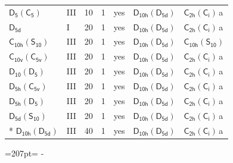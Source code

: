 \documentclass[10pt,a4paper]{article}
\newcommand{\needspace}[1]{\par\penalty-100\begingroup\dimen0=#1\relax\dimen2=\pagegoal
  \advance\dimen2-\pagetotal\ifdim\dimen0>\dimen2\relax\ifdim\dimen2>0pt\vfil\break\fi\fi
  \endgroup}
\numberwithin{equation}{section}
\newcommand{\grp}[1]{\mathsf{#1}}
\newcommand{\clsletter}[1]{\,{\scriptsize\color{black!55}#1}}
\begin{document}
{\begin{longtable}{@{}llrrlll@{}}
\href{D5-C5.pdf}{$\grp{D_{5}}(\grp{C_{5}})$} & III & 10 & 1 & yes & \href{D10h-D5d.pdf}{$\grp{D_{10h}}(\grp{D_{5d}})$} & \href{C2h-S2.pdf}{$\grp{C_{2h}}(\grp{C_{i}})$}\clsletter{a}\\
\href{../../../rotation/data/pdf/D5d.pdf}{$\grp{D_{5d}}$} & I & 20 & 1 & yes & \href{D10h-D5d.pdf}{$\grp{D_{10h}}(\grp{D_{5d}})$} & \href{C2h-S2.pdf}{$\grp{C_{2h}}(\grp{C_{i}})$}\clsletter{a}\\
\href{C10h-S10.pdf}{$\grp{C_{10h}}(\grp{S_{10}})$} & III & 20 & 1 & yes & \href{D10h-D5d.pdf}{$\grp{D_{10h}}(\grp{D_{5d}})$} & \href{C10h-S10.pdf}{$\grp{C_{10h}}(\grp{S_{10}})$}\\
\href{C10v-C5v.pdf}{$\grp{C_{10v}}(\grp{C_{5v}})$} & III & 20 & 1 & yes & \href{D10h-D5d.pdf}{$\grp{D_{10h}}(\grp{D_{5d}})$} & \href{C2h-S2.pdf}{$\grp{C_{2h}}(\grp{C_{i}})$}\clsletter{a}\\
\href{D10-D5.pdf}{$\grp{D_{10}}(\grp{D_{5}})$} & III & 20 & 1 & yes & \href{D10h-D5d.pdf}{$\grp{D_{10h}}(\grp{D_{5d}})$} & \href{C2h-S2.pdf}{$\grp{C_{2h}}(\grp{C_{i}})$}\clsletter{a}\\
\href{D5h-C5v.pdf}{$\grp{D_{5h}}(\grp{C_{5v}})$} & III & 20 & 1 & yes & \href{D10h-D5d.pdf}{$\grp{D_{10h}}(\grp{D_{5d}})$} & \href{C2h-S2.pdf}{$\grp{C_{2h}}(\grp{C_{i}})$}\clsletter{a}\\
\href{D5h-D5.pdf}{$\grp{D_{5h}}(\grp{D_{5}})$} & III & 20 & 1 & yes & \href{D10h-D5d.pdf}{$\grp{D_{10h}}(\grp{D_{5d}})$} & \href{C2h-S2.pdf}{$\grp{C_{2h}}(\grp{C_{i}})$}\clsletter{a}\\
\href{D5d-S10.pdf}{$\grp{D_{5d}}(\grp{S_{10}})$} & III & 20 & 1 & yes & \href{D10h-D5d.pdf}{$\grp{D_{10h}}(\grp{D_{5d}})$} & \href{C2h-S2.pdf}{$\grp{C_{2h}}(\grp{C_{i}})$}\clsletter{a}\\*
\href{D10h-D5d.pdf}{$\grp{D_{10h}}(\grp{D_{5d}})$} & III & 40 & 1 & yes & \href{D10h-D5d.pdf}{$\grp{D_{10h}}(\grp{D_{5d}})$} & \href{C2h-S2.pdf}{$\grp{C_{2h}}(\grp{C_{i}})$}\clsletter{a}\\
\bottomrule\end{longtable}}
\needspace{207pt}
\end{document}
